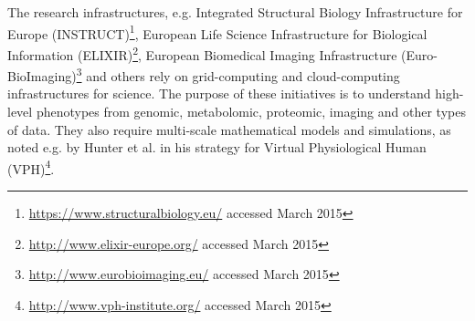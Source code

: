 \begin{itemize}

The research infrastructures, e.g. Integrated Structural Biology Infrastructure for Europe (INSTRUCT)\footnote{\url{https://www.structuralbiology.eu/} accessed March 2015}, European Life Science Infrastructure for Biological Information (ELIXIR)\footnote{\url{http://www.elixir-europe.org/} accessed March 2015},  European Biomedical Imaging Infrastructure (Euro-BioImaging)\footnote{\url{http://www.eurobioimaging.eu/} accessed March 2015} and others rely on grid-computing and cloud-computing infrastructures for science. The purpose of these initiatives is to understand high-level phenotypes from genomic, metabolomic, proteomic, imaging and other types of data. They also require multi-scale mathematical models and simulations, as noted e.g. by Hunter et al. \cite{Hunter2013} in his strategy for Virtual Physiological Human (VPH)\footnote{\url{http://www.vph-institute.org/} accessed March 2015}. 


\end{itemize}
